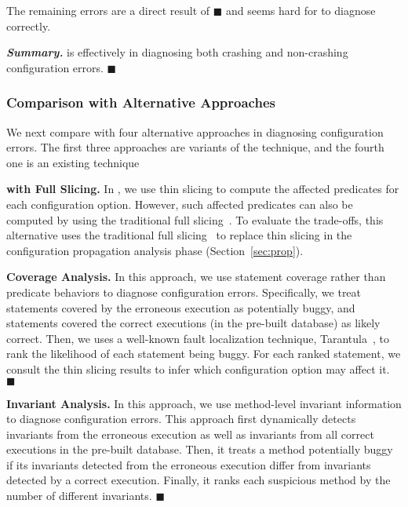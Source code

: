 
The remaining errors are a direct result of $\blacksquare$ and seems
hard for \ourtool to diagnose correctly.




\vspace{1mm}
\noindent \textbf{\textit{Summary.}} \ourtool is effectively
in diagnosing both crashing and non-crashing configuration errors. $\blacksquare$


\subsubsection{Comparison with Alternative Approaches}
\label{sec:comparison}

We next compare \ourtool with four alternative approaches
in diagnosing configuration errors.
The first three approaches are variants of the \ourtool
technique, and the fourth one is an existing technique~\cite{Rabkin:2011:PPC}

\vspace{1mm}
\noindent \textbf{\ourtool with Full Slicing.} 
In \ourtool, we use thin slicing to compute the affected predicates for
each configuration option. However, such affected predicates
can also be computed by using the traditional full slicing~\cite{Horwitz:1988}.
To evaluate the trade-offs, this alternative uses the traditional
full slicing~\cite{Horwitz:1988} to replace thin slicing
in the configuration propagation analysis phase (Section~\ref{sec:prop}).

\vspace{1mm}
\noindent \textbf{Coverage Analysis.}
In this approach, we use statement coverage rather than
predicate behaviors to diagnose configuration errors. Specifically,
we treat statements covered by the erroneous execution as
potentially buggy, and statements covered the correct executions (in
the pre-built database) as likely correct. Then, we uses
a well-known fault localization technique, Tarantula~\cite{},
to rank the likelihood of each statement being buggy.
For each ranked statement, we consult the thin slicing results
to infer which configuration option may affect it. $\blacksquare$


\vspace{1mm}
\noindent \textbf{Invariant Analysis.}
In this approach, we use method-level invariant information
to diagnose configuration errors. This approach first dynamically
detects invariants from the erroneous execution as well as invariants
from all correct executions in the pre-built database. Then, it
treats a method potentially buggy if its invariants detected
from the erroneous execution differ from invariants detected
by a correct execution. Finally, it ranks each suspicious
method by the number of different invariants. $\blacksquare$



